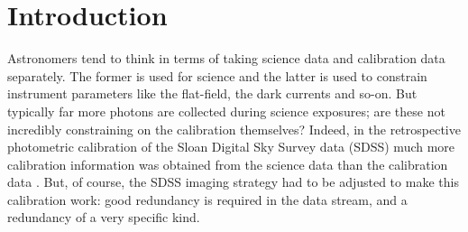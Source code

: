 \documentclass[manuscript]{aastex}
\begin{document}




\section{Introduction}
Astronomers tend to think in terms of taking science data and calibration data separately. The former is used for science and the latter is used to constrain instrument parameters like the flat-field, the dark currents and so-on. But typically far more photons are collected during science exposures; are these not incredibly constraining on the calibration themselves? Indeed, in the retrospective photometric calibration of the Sloan Digital Sky Survey data (SDSS) much more calibration information was obtained from the science data than the calibration data \citep{pad08}. But, of course, the SDSS imaging strategy had to be adjusted to make this calibration work: good redundancy is required in the data stream, and a redundancy of a very specific kind.
\end{document}
